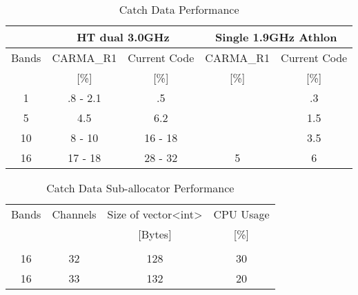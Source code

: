 \documentclass[11pt]{article}
\begin{document}
\begin{table}[thb]
\caption{Catch Data Performance}
\label{tab:catchDataPer}
\begin{center}
\begin{tabular}{|c|c|c|c|c|}
\hline
      & \multicolumn{2}{|c|}{HT dual 3.0GHz} & \multicolumn{2}{|c|}{Single 1.9GHz Athlon} \\
\hline
Bands & CARMA\_R1   & Current Code  & CARMA\_R1 & Current Code \\
      & [\%]      & [\%]         & [\%] & [\%] \\
\hline\hline
 1 & .8 - 2.1 & .5      &   & .3  \\
 5 & 4.5      & 6.2     &   & 1.5 \\
10 &  8 - 10  & 16 - 18 &   & 3.5 \\
16 & 17 - 18  & 28 - 32 & 5 & 6   \\
\hline
\end{tabular}
\end{center}
\end{table}

\begin{table}[thb]
\caption{Catch Data Sub-allocator Performance}
\label{tab:catchDataAllocator}
\begin{center}
\begin{tabular}{|c|c|c|c|}
\hline
Bands & Channels & Size of vector<int> & CPU Usage \\
      &          &   [Bytes]           &   [\%]    \\
&&& \\
\hline\hline
 16 & 32 & 128 & 30 \\
 16 & 33 & 132 & 20 \\
\hline
\end{tabular}
\end{center}
\end{table}
\end{document}
